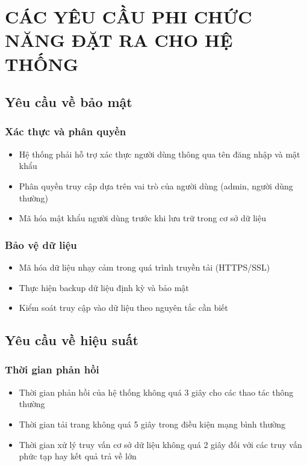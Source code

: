 \chapter{CÁC YÊU CẦU PHI CHỨC NĂNG ĐẶT RA CHO HỆ THỐNG}

\section{Yêu cầu về bảo mật}

\subsection{Xác thực và phân quyền}
\begin{itemize}
  \item Hệ thống phải hỗ trợ xác thực người dùng thông qua tên đăng nhập và mật khẩu
  \item Phân quyền truy cập dựa trên vai trò của người dùng (admin, người dùng thường)
  \item Mã hóa mật khẩu người dùng trước khi lưu trữ trong cơ sở dữ liệu
\end{itemize}

\subsection{Bảo vệ dữ liệu}
\begin{itemize}
  \item Mã hóa dữ liệu nhạy cảm trong quá trình truyền tải (HTTPS/SSL)
  \item Thực hiện backup dữ liệu định kỳ và bảo mật
  \item Kiểm soát truy cập vào dữ liệu theo nguyên tắc cần biết
\end{itemize}

\section{Yêu cầu về hiệu suất}

\subsection{Thời gian phản hồi}
\begin{itemize}
  \item Thời gian phản hồi của hệ thống không quá 3 giây cho các thao tác thông thường
  \item Thời gian tải trang không quá 5 giây trong điều kiện mạng bình thường
  \item Thời gian xử lý truy vấn cơ sở dữ liệu không quá 2 giây đối với các truy vấn phức tạp hay kết quả trả về lớn
\end{itemize}


